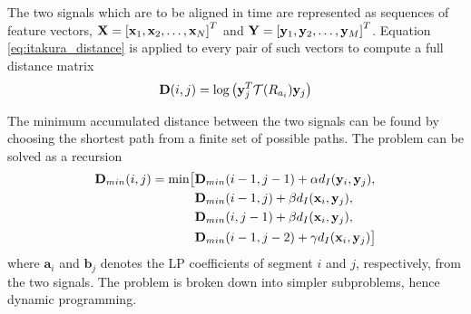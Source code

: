 The two signals which are to be aligned in time are represented as sequences of feature vectors, $\mathbf{X}=\left[\mathbf{x}_1,\mathbf{x}_2,\dotsc,\mathbf{x}_N\right]^T$ and $\mathbf{Y}=\left[\mathbf{y}_1,\mathbf{y}_2,\dotsc,\mathbf{y}_M\right]^T$. Equation \eqref{eq:itakura_distance} is applied to every pair of such vectors to compute a full distance matrix
\begin{equation}
	\mathbf{D}(i,j) = \log\left(\mathbf{y}_j^T \mathcal T(R_{a_i}) \mathbf{y}_j\right)
\end{equation}

The minimum accumulated distance between the two signals can be found by choosing the shortest path from a finite set of possible paths. The problem can be solved as a recursion \cite{taletek} 
\newcommand{\dmin}{\textbf{D}_{min}}
\begin{equation}
	\label{eq:dtw_recursion}
	\begin{split}
		\dmin(i,j) = \min \bigl[& \dmin(i-1,j-1)+\alpha \ita(\mathbf{y}_i,\mathbf{y}_j),\\
		& \dmin(i-1,j)+\beta \ita(\mathbf{x}_i,\mathbf{y}_j),\\
		& \dmin(i,j-1)+\beta \ita(\mathbf{x}_i,\mathbf{y}_j),\\
		& \dmin(i-1,j-2)+\gamma \ita(\mathbf{x}_i,\mathbf{y}_j)\bigr]		
	\end{split}
\end{equation}
where $\mathbf{a}_i$ and $\mathbf{b}_j$ denotes the LP coefficients of segment $i$ and $j$, respectively, from the two signals. The problem is broken down into simpler subproblems, hence dynamic programming. 

